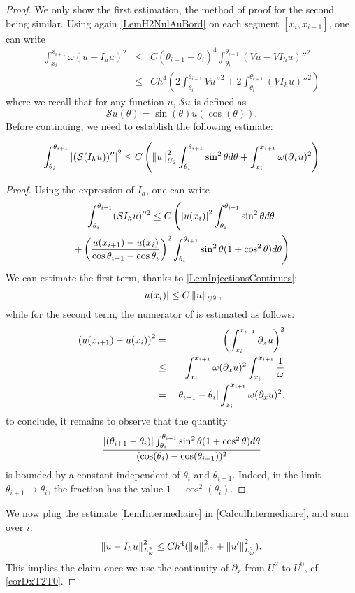 \documentclass[a4paper]{article}
\begin{document}
\begin{proof}
	We only show the first estimation, the method of proof for the second being similar. Using again \autoref{LemH2NulAuBord} on each segment $[x_i, x_{i+1}]$, one can write
	\begin{eqnarray*}
		\int_{x_i}^{x_{i+1}} \omega (u - I_h u)^2 &\leq& C  (\theta_{i+1} - \theta_i)^4 \int_{\theta_i}^{\theta_{i+1}} (Vu- VI_h u)''^2 \\
		&\leq& C h^4 \left(2\int_{\theta_i}^{\theta_{i+1}} Vu''^2 + 2\int_{\theta_i}^{\theta_{i+1}}(VI_hu)''^2\right)
	\end{eqnarray*}
	where we recall that for any function $u$, $\mathcal{S}u$ is defined as 
	\[\mathcal{S}u(\theta) = \sin(\theta)u(\cos(\theta)).\] 
	Before continuing, we need to establish the following estimate:
\begin{Lem}
	\[\int_{\theta_i}^{\theta_{i+1}} \left\lvert (\mathcal{S} (I_hu))'' \right\rvert^2 \leq  C \left(\left\|u\right\|^2_{U_2} \int_{\theta_i}^{\theta_{i+1}} \sin^2\theta d\theta +  \int_{x_i}^{x_{i+1}} \omega (\partial_x u)^2\right)\]
	\label{LemIntermediaire}
\end{Lem}
\begin{proof}
	Using the expression of $I_h$, one can write
	\begin{multline}
	\int_{\theta_i}^{\theta_{i+1}} (\mathcal{S} I_hu)''^2\leq C\left(\left\lvert  u(x_i) \right\rvert^2 \int_{\theta_i}^{\theta_{i+1}} \sin^2\theta d\theta \right.\\
	\left.+ \left(\frac{u(x_{i+1}) -  u(x_{i})}{\cos\theta_{i+1} - \cos\theta_i}\right)^2 \int_{\theta_i}^{\theta_{i+1}} \sin^2\theta(1 + \cos^2\theta)d\theta\right)
	\label{CalculIntermediaire}
	\end{multline}
	We can estimate the first term, thanks to \autoref{LemInjectionsContinues}:
	\[\left\lvert  u(x_i) \right\rvert \leq C \left\|u\right\|_{U^2},\]
	while for the second term, the numerator of is estimated as follows: 
	\begin{eqnarray*}
		\left(u(x_{i+1}) - u(x_i)\right)^2 &=& \left(  \int_{x_i}^{x_{i+1}} \partial_x  u\right)^2 \\
		& \leq & \int_{x_i}^{x_{i+1}} \omega (\partial_x u)^2 \int_{x_i}^{x_{i+1}} \frac{1}{\omega} \\
		&  = & \left\lvert \theta_{i+1} - \theta_i \right\rvert\int_{x_i}^{x_{i+1}} \omega (\partial_x u)^2.
	\end{eqnarray*}
	to conclude, it remains to observe that the quantity 
	\[\frac{\left\lvert (\theta_{i+1} - \theta_i) \right\rvert \int_{\theta_i}^{\theta_{i+1}}{\sin^2\theta(1 + \cos^2\theta)d\theta}}{(\cos(\theta_{i}) - \cos(\theta_{i+1}))^2}\]
	is bounded by a constant independent of $\theta_i$ and $\theta_{i+1}$. Indeed, in the limit $\theta_{i+1} \to \theta_{i}$, the fraction has the value $1 + \cos^2(\theta_i)$. 
\end{proof}
	\noindent We now plug the estimate \autoref{LemIntermediaire} in \eqref{CalculIntermediaire}, and sum over $i$:
	\[\left\|u - I_hu\right\|^2_{L^2_\omega} \leq C h^4(\left\|u\right\|_{U^2}^2 + \left\|u'\right\|_{L^2_\omega}^2).\]
	This implies the claim once we use the continuity of $\partial_x$ from $U^2$ to $U^0$, cf. \autoref{corDxT2T0}.
\end{proof}
\end{document}
